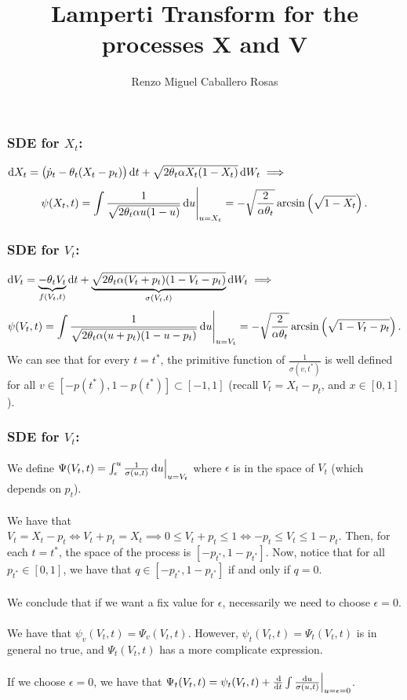 \documentclass[aspectratio=169]{beamer}\usepackage[utf8]{inputenc}
\title{Lamperti Transform for the processes X and V}
\subtitle{Renzo Miguel Caballero Rosas}
\begin{document}
\begin{frame}
\titlepage
\end{frame}

\begin{frame}\frametitle{SDE for $X_t$:}

$\dif X_t=\left(\dot p_t-\theta_t(X_t-p_t)\right)\dif t+\sqrt{2\theta_t\alpha X_t(1-X_t)}\dif W_t\implies$
\begin{equation*}
\psi(X_t,t)=\int\frac{1}{\sqrt{2\theta_t\alpha u(1-u)}}\dif u\Bigg|_{u=X_t}=-\sqrt{\frac{2}{\alpha\theta_t}}\arcsin\left(\sqrt{1-X_t}\right).
\end{equation*}

\end{frame}


\begin{frame}\frametitle{SDE for $V_t$:}

$\dif V_t=\underbrace{-\theta_tV_t}_{f(V_t,t)}\dif t+\underbrace{\sqrt{2\theta_t\alpha(V_t+p_t)(1-V_t-p_t)}}_{\sigma(V_t,t)}\dif W_t\implies$
\begin{equation*}
\psi(V_t,t)=\int\frac{1}{\sqrt{2\theta_t\alpha(u+p_t)(1-u-p_t)}}\dif u\Bigg|_{u=V_t}=-\sqrt{\frac{2}{\alpha\theta_t}}\arcsin\left(\sqrt{1-V_t-p_t}\right).
\end{equation*}
We can see that for every $t=t^*$, the primitive function of $\frac{1}{\sigma(v,t^*)}$ is well defined for all $v\in\left[-p(t^*),1-p(t^*)\right]\subset[-1,1]$ (recall $V_t=X_t-p_t$, and $x\in[0,1]$).

\end{frame}


\begin{frame}\frametitle{SDE for $V_t$:}

We define $\Psi(V_t,t)=\int_{\epsilon}^u\frac{1}{\sigma(u,t)}\dif u\Big|_{u=V_t}$ where $\epsilon$ is in the space of $V_t$ (which depends on $p_t$).\\
\quad\\
We have that $V_t=X_t-p_t\iff V_t+p_t=X_t\implies0\leq V_t+p_t\leq1\iff-p_t\leq V_t\leq1-p_t$. Then, for each $t=t^*$, the space of the process is $[-p_{t^*},1-p_{t^*}]$. Now, notice that for all $p_{t^*}\in[0,1]$, we have that $q\in[-p_{t^*},1-p_{t^*}]$ if and only if $q=0$.\\
\quad\\
We conclude that if we want a fix value for $\epsilon$, necessarily we need to choose $\epsilon=0$.\\
\quad\\
We have that $\psi_v(V_t,t)=\Psi_v(V_t,t)$. However, $\psi_t(V_t,t)=\Psi_t(V_t,t)$ is in general no true, and $\Psi_t(V_t,t)$ has a more complicate expression.\\
\quad\\
If we choose $\epsilon=0$, we have that $\Psi_t(V_t,t)=\psi_t(V_t,t)+\frac{\dif}{\dif t}\int\frac{\dif u}{\sigma(u,t)}\Big|_{u=\epsilon=0}$.

\end{frame}
\end{document}

